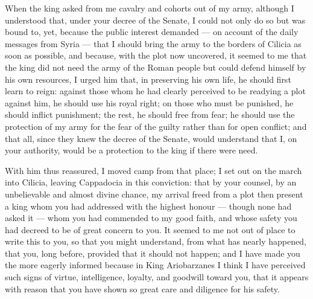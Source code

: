  When the king asked from me cavalry and cohorts out of my army, although I understood that, under your decree of the Senate, I could not only do so but was bound to, yet, because the public interest demanded --- on account of the daily messages from Syria --- that I should bring the army to the borders of Cilicia as soon as possible, and because, with the plot now uncovered, it seemed to me that the king did not need the army of the Roman people but could defend himself by his own resources, I urged him that, in preserving his own life, he should first learn to reign: against those whom he had clearly perceived to be readying a plot against him, he should use his royal right; on those who must be punished, he should inflict punishment; the rest, he should free from fear; he should use the protection of my army for the fear of the guilty rather than for open conflict; and that all, since they knew the decree of the Senate, would understand that I, on your authority, would be a protection to the king if there were need.

 With him thus reassured, I moved camp from that place; I set out on the march into Cilicia, leaving Cappadocia in this conviction: that by your counsel, by an unbelievable and almost divine chance, my arrival freed from a plot then present a king whom you had addressed with the highest honour --- though none had asked it --- whom you had commended to my good faith, and whose safety you had decreed to be of great concern to you. It seemed to me not out of place to write this to you, so that you might understand, from what has nearly happened, that you, long before, provided that it should not happen; and I have made you the more eagerly informed because in King Ariobarzanes I think I have perceived such signs of virtue, intelligence, loyalty, and goodwill toward you, that it appears with reason that you have shown so great care and diligence for his safety.
